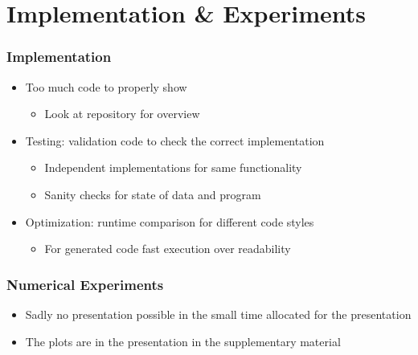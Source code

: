 \section{Implementation \& Experiments}
    \begin{frame}[t]
        \frametitle{Implementation}
        
        \begin{itemize}
            \item Too much code to properly show 
            \begin{itemize}
                \item Look at repository for overview
            \end{itemize}
            \pause
            \item Testing: validation code to check the correct implementation
            \begin{itemize}
                \item Independent implementations for same functionality
                \item Sanity checks for state of data and program
            \end{itemize}
            \pause
            \item Optimization: runtime comparison for different code styles
            \begin{itemize}
                \item For generated code fast execution over readability
            \end{itemize}
        \end{itemize}

        \onslide %
    \end{frame}

    \begin{frame}[t]
        \frametitle{Numerical Experiments}
        
        \begin{itemize}
            \item Sadly no presentation possible in the small time allocated for the presentation
            \item The plots are in the presentation in the supplementary material
        \end{itemize}


        \onslide %
    \end{frame}
